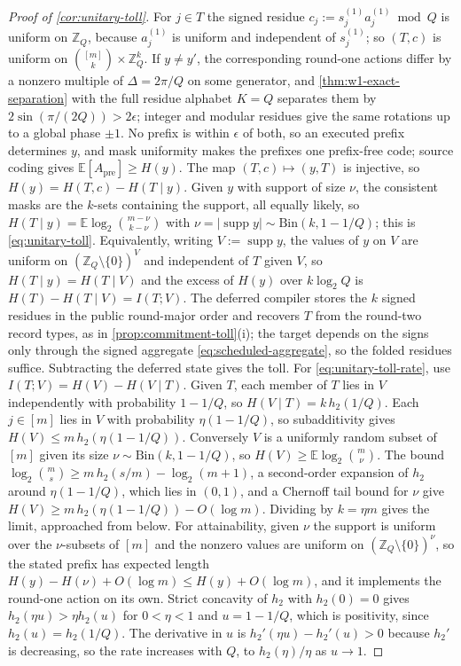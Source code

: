 \begin{proof}[Proof of \cref{cor:unitary-toll}]
For $j\in T$ the signed residue $c_j:=s^{(1)}_ja^{(1)}_j\bmod Q$ is
uniform on $\mathbb Z_Q$, because $a^{(1)}_j$ is uniform and independent
of $s^{(1)}_j$; so $(T,c)$ is uniform on $\binom{[m]}{k}\times\mathbb Z_Q^k$.
If $y\neq y'$, the corresponding round-one actions differ by a nonzero
multiple of $\Delta=2\pi/Q$ on some generator, and
\cref{thm:w1-exact-separation} with the full residue alphabet $K=Q$
separates them by $2\sin(\pi/(2Q))>2\epsilon$; integer and modular
residues give the same rotations up to a global phase $\pm1$.  No prefix is within $\epsilon$ of both, so
an executed prefix determines $y$, and mask uniformity makes the
prefixes one prefix-free code; source coding gives
$\mathbb E[A_{\mathrm{pre}}]\geq H(y)$.  The map $(T,c)\mapsto(y,T)$ is
injective, so $H(y)=H(T,c)-H(T\mid y)$.  Given $y$ with support of
size $\nu$, the consistent masks are the $k$-sets containing the
support, all equally likely, so
$H(T\mid y)=\mathbb E\log_2\binom{m-\nu}{k-\nu}$ with
$\nu=|\operatorname{supp}y|\sim\mathrm{Bin}(k,1-1/Q)$; this is
\eqref{eq:unitary-toll}.  Equivalently, writing $V:=\operatorname{supp}y$,
the values of $y$ on $V$ are uniform on $(\mathbb Z_Q\setminus\{0\})^V$ and
independent of $T$ given $V$, so $H(T\mid y)=H(T\mid V)$ and the excess of
$H(y)$ over $k\log_2Q$ is $H(T)-H(T\mid V)=I(T;V)$.  The deferred compiler stores the $k$ signed
residues in the public round-major order and recovers $T$ from the
round-two record types, as in \cref{prop:commitment-toll}(i); the target
depends on the signs only through the signed aggregate
\eqref{eq:scheduled-aggregate}, so the folded residues suffice.
Subtracting the deferred state gives the toll.  For
\eqref{eq:unitary-toll-rate}, use $I(T;V)=H(V)-H(V\mid T)$.  Given $T$,
each member of $T$ lies in $V$ independently with probability $1-1/Q$,
so $H(V\mid T)=k\,h_2(1/Q)$.  Each $j\in[m]$ lies in $V$ with
probability $\eta(1-1/Q)$, so subadditivity gives
$H(V)\leq m\,h_2(\eta(1-1/Q))$.  Conversely $V$ is a uniformly random
subset of $[m]$ given its size $\nu\sim\mathrm{Bin}(k,1-1/Q)$, so
$H(V)\geq\mathbb E\log_2\binom{m}{\nu}$.  The bound
$\log_2\binom ms\geq m\,h_2(s/m)-\log_2(m+1)$, a second-order expansion
of $h_2$ around $\eta(1-1/Q)$, which lies in $(0,1)$, and a Chernoff tail
bound for $\nu$ give $H(V)\geq m\,h_2(\eta(1-1/Q))-O(\log m)$.  Dividing by
$k=\eta m$ gives the limit, approached from below.  For attainability,
given $\nu$ the support is uniform over the $\nu$-subsets of $[m]$ and the
nonzero values are uniform on $(\mathbb Z_Q\setminus\{0\})^\nu$, so the
stated prefix has expected length
$H(y)-H(\nu)+O(\log m)\leq H(y)+O(\log m)$, and it implements the round-one
action on its own.  Strict concavity of
$h_2$ with $h_2(0)=0$ gives $h_2(\eta u)>\eta h_2(u)$ for $0<\eta<1$ and
$u=1-1/Q$, which is positivity, since $h_2(u)=h_2(1/Q)$.  The derivative
in $u$ is $h_2'(\eta u)-h_2'(u)>0$ because $h_2'$ is decreasing, so the
rate increases with $Q$, to $h_2(\eta)/\eta$ as $u\to1$.
\end{proof}
